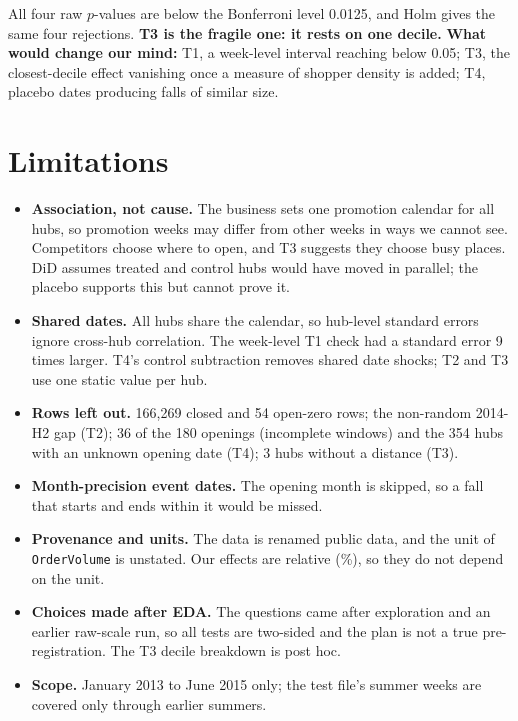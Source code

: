 \documentclass[10pt,a4paper,twocolumn]{article}
\newcommand{\key}[1]{\textbf{\textcolor{keyblue}{#1}}}
\newcommand{\warn}[1]{\textbf{\textcolor{warnor}{#1}}}
\newcommand{\code}[1]{\texttt{#1}}
\begin{document}
All four raw $p$-values are below the Bonferroni level 0.0125, and Holm gives the same four rejections. \warn{T3 is the fragile one: it rests on one decile.}
\key{What would change our mind:} T1, a week-level interval reaching below 0.05; T3, the closest-decile effect
vanishing once a measure of shopper density is added; T4, placebo dates producing falls of similar size.

\section{Limitations}

\begin{itemize}
  \item \key{Association, not cause.} The business sets one promotion calendar for all hubs, so promotion weeks may
  differ from other weeks in ways we cannot see. Competitors choose where to open, and T3 suggests they choose busy
  places. DiD assumes treated and control hubs would have moved in parallel; the placebo supports this but cannot prove it.
  \item \key{Shared dates.} All hubs share the calendar, so hub-level standard errors ignore cross-hub correlation.
  The week-level T1 check had a standard error 9 times larger. T4's control subtraction removes shared date shocks;
  T2 and T3 use one static value per hub.
  \item \key{Rows left out.} 166{,}269 closed and 54 open-zero rows; the non-random 2014-H2 gap (T2); 36 of the 180
  openings (incomplete windows) and the 354 hubs with an unknown opening date (T4); 3 hubs without a distance (T3).
  \item \key{Month-precision event dates.} The opening month is skipped, so a fall that starts and ends within it
  would be missed.
  \item \key{Provenance and units.} The data is renamed public data, and the unit of \code{OrderVolume} is unstated.
  Our effects are relative (\%), so they do not depend on the unit.
  \item \key{Choices made after EDA.} The questions came after exploration and an earlier raw-scale run, so all tests
  are two-sided and the plan is not a true pre-registration. The T3 decile breakdown is post hoc.
  \item \key{Scope.} January 2013 to June 2015 only; the test file's summer weeks are covered only through earlier
  summers.
\end{itemize}
\end{document}
